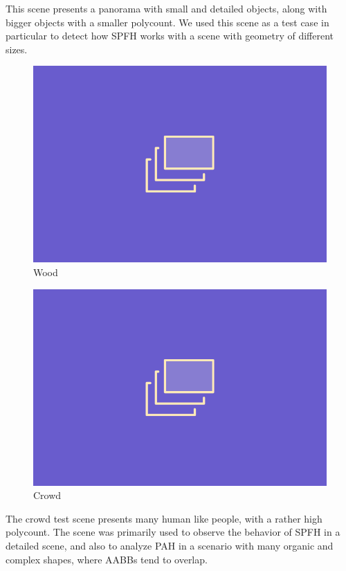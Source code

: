 \documentclass{PoliMi_MasterThesis}
\begin{document}
\begin{minipage}{0.55\textwidth}
	This scene presents a panorama with small and detailed objects, along with bigger objects with a smaller polycount. We used this scene as a test case in particular to detect how SPFH works with a scene with geometry of different sizes.
\end{minipage}
\hfill \begin{minipage}{0.4\textwidth}
	\begin{figure}[H]
		\includegraphics[width=\textwidth]{Images/TODO.png}
		\caption{Wood}
		\label{fig:Wood}
	\end{figure}
\end{minipage} 

\begin{minipage}{0.4\textwidth}
	\begin{figure}[H]
		\includegraphics[width=\textwidth]{Images/TODO.png}
		\caption{Crowd}
		\label{fig:crowd}
	\end{figure}
\end{minipage} \hfill
\begin{minipage}{0.55\textwidth}
	The crowd test scene presents many human like people, with a rather high polycount. The scene was primarily used to observe the behavior of SPFH in a detailed scene, and also to analyze PAH in a scenario with many organic and complex shapes, where AABBs tend to overlap.
\end{minipage}
\end{document}
